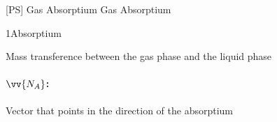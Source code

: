 \documentclass[\mainfilename]{subfiles}
\begin{document}

[PS]
{Gas Absorptium} %
{Gas Absorptium} %

\begin{sectionBox}1{Absorptium} %
    
    Mass transference between the gas phase and the liquid phase
    \paragraph*{\(\vv{N_A}\):} Vector that points in the direction of the absorptium
    
\end{sectionBox}
\end{document}
